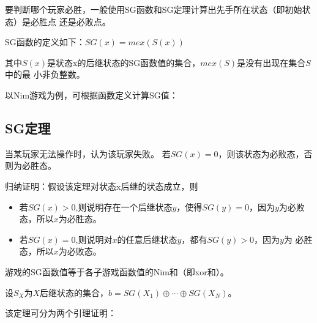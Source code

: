 要判断哪个玩家必胜，一般使用SG函数和SG定理计算出先手所在状态（即初始状态）是必胜点
还是必败点。

SG函数的定义如下：$SG(x)=mex(S(x))$

其中$S(x)$是状态x的后继状态的SG函数值的集合，$mex(S)$是没有出现在集合$S$中的最
小非负整数。

以Nim游戏为例，可根据函数定义计算SG值：



\subsection{SG定理}


\begin{theorem}
	当某玩家无法操作时，认为该玩家失败。
	若$SG(x)=0$，则该状态为必败态，否则为必胜态。
\end{theorem}

归纳证明：假设该定理对状态x后继的状态成立，则

\begin{itemize}
	\item 若$SG(x)>0$,则说明存在一个后继状态$y$，使得$SG(y)=0$，因为$y$为必败
	      态，所以$x$为必胜态。
	\item 若$SG(x)=0$,则说明对$x$的任意后继状态$y$，都有$SG(y)>0$，因为$y$为
	      必胜态，所以$x$为必败态。
\end{itemize}

\begin{theorem}\label{SGB}
	游戏的SG函数值等于各子游戏函数值的Nim和（即xor和）。
\end{theorem}

设$S_X$为$X$后继状态的集合，$b=SG(X_1)\oplus \cdots \oplus SG(X_N)$。

该定理可分为两个引理证明：

